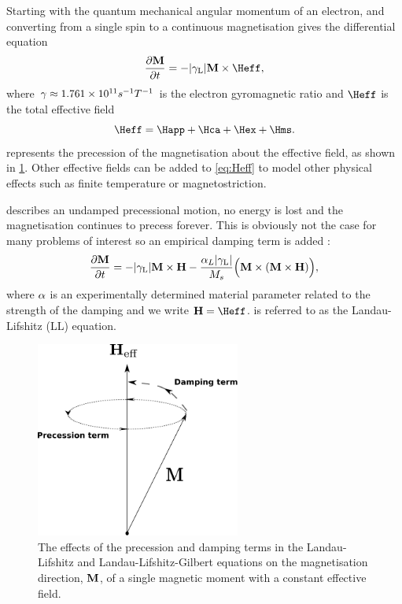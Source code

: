 Starting with the quantum mechanical angular momentum of an electron, and converting from a single spin to a continuous magnetisation gives the differential equation \cite[306]{Coey2010}
\begin{equation}
  \label{eq:38}
  \dMdt = - \gymagc \Mv \times \Heff,
\end{equation}
where $\gamma \approx 1.761 \times 10^{11} s^{-1} T^{-1}$ is the electron gyromagnetic ratio and $\Heff$ is the total effective field
\begin{equation}
  \Heff = \Happ + \Hca + \Hex + \Hms.
  \label{eq:Heff}
\end{equation}
 represents the precession of the magnetisation about the effective field, as shown in \cref{fig:LLG-terms}. Other effective fields can be added to \cref{eq:Heff} to model other physical effects such as finite temperature or magnetostriction.

 describes an undamped precessional motion, \ie no energy is lost and the magnetisation continues to precess forever. This is obviously not the case for many problems of interest so an empirical damping term is added \cite{Landau1935}:
\begin{equation}
  \label{eq:LL}
  \frac{\partial \boldsymbol{\mathrm{M}}}{\partial t} = - {\left|{\gamma_{\mathrm{\tiny{L}}}} \right|} \boldsymbol{\mathrm{M}} \times \boldsymbol{\mathrm{H}} - \frac{\alpha_L {\left|{\gamma_{\mathrm{\tiny{L}}}} \right|}}{M_s} \Big( \boldsymbol{\mathrm{M}} \times (\boldsymbol{\mathrm{M}} \times \boldsymbol{\mathrm{H}}) \Big),
\end{equation}
where $\alpha$ is an experimentally determined material parameter related to the strength of the damping and we write $\Hv = \Heff$.  is referred to as the Landau-Lifshitz (LL) equation.

\begin{figure}
  \centering
  \includegraphics[width=0.6\textwidth]{./images/LLG-terms}
  \caption{The effects of the precession and damping terms in the Landau-Lifshitz and Landau-Lifshitz-Gilbert equations on the magnetisation direction, $\boldsymbol{\mathrm{M}}$, of a single magnetic moment with a constant effective field.}
  \label{fig:LLG-terms}
\end{figure}

